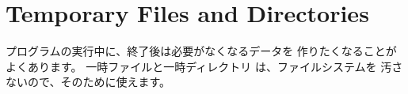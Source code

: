 \section{Temporary Files and Directories}

プログラムの実行中に、終了後は必要がなくなるデータを 作りたくなることがよくあります。 一時ファイルと一時ディレクトリ は、ファイルシステムを 汚さないので、そのために使えます。




